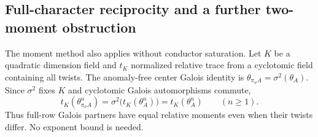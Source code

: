 \subsection{Full-character reciprocity and a further two-moment obstruction}
\label{sec:r2603-center-moments}

The moment method also applies without conductor saturation. Let $K$ be
a quadratic dimension field and $t_K$ normalized relative trace from a
cyclotomic field containing all twists. The anomaly-free center Galois
identity is $\theta_{\pi_\sigma A}=\sigma^2(\theta_A)$. Since
$\sigma^2$ fixes $K$ and cyclotomic Galois automorphisms commute,
\begin{equation}\label{eq:quadratic-relative-moment-pairing}
 t_K(\theta_{\pi_\sigma A}^n)
   =\sigma^2\bigl(t_K(\theta_A^n)\bigr)=t_K(\theta_A^n)
 \qquad(n\geq1).
\end{equation}
Thus full-row Galois partners have equal relative moments even when
their twists differ. No exponent bound is needed.

